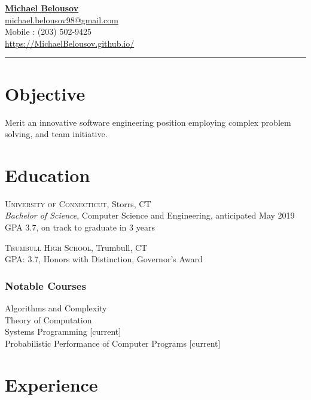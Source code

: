 \documentclass[Letterpaper,11pt]{article}
\begin{document}
\setlength{\parindent}{0em}
\setlength{\parskip}{1em}
\setlength{\parsep}{1em}
\setlength{\itemsep}{0.2em}
\setlength{\headsep}{0.2em}
\setlength{\topskip}{0.2em}
\setlength{\topmargin}{0.2em}
\setlength{\topsep}{0.2em}
\setlength{\partopsep}{0.2em}
\setlength{\columnsep}{1em}

\addtolength{\topmargin}{-2em}

\textbf{\href{mailto:michael.belousov98@gmail.com}{\Large Michael Belousov}}\\
\href{mailto:michael.belousov98@gmail.com}{michael.belousov98@gmail.com}\\
Mobile : (203) 502-9425\\
\href{https://MichaelBelousov.github.io/}{https://MichaelBelousov.github.io/}\\
\hrule

\section*{Objective}

Merit an innovative software engineering position employing complex problem solving, and team initiative.

\section*{Education}

    \textsc{University of Connecticut}, Storrs, CT\\
    \textit{Bachelor of Science}, Computer Science and Engineering, anticipated May 2019\\
    GPA 3.7, on track to graduate in 3 years

    \textsc{Trumbull High School}, Trumbull, CT\\
    GPA: 3.7, Honors with Distinction, Governor's Award

    \subsubsection*{Notable Courses}
    Algorithms and Complexity\\
    Theory of Computation\\
    Systems Programming [current]\\
    Probabilistic Performance of Computer Programs [current]

\section*{Experience}
\end{document}
